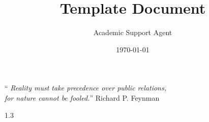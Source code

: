 \documentclass{article}
\title{Template Document}
\author{Academic Support Agent}
\date{\today}
\begin{document}
\maketitle

\pagestyle{empty}





{
\vspace*{0.2\textheight}
\large
\noindent\hfill\enquote{\itshape 
Reality must take precedence over public relations,\\
\vspace{-1cm}
\null\hfill{for nature cannot be fooled.}}
\bigbreak
}
\large
\hfill Richard P. Feynman
\normalsize


\justifying

\setlength{\skip\footins}{8mm}

\setlength{\parindent}{0pt}
\setlength{\parskip}{2mm}











\begin{spacing}{1.3}
\pagestyle{toclof}






\end{spacing}








\end{document}
